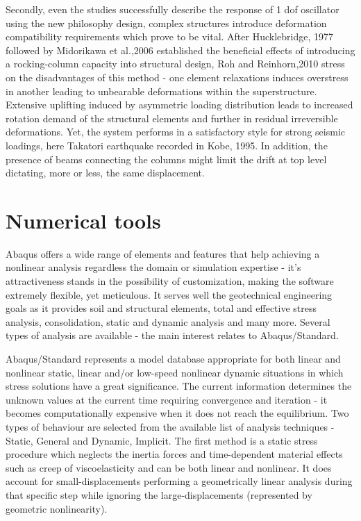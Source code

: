 \documentclass[12pt,a4paper]{report}
\begin{document}
Secondly, even the studies successfully describe the response of 1 dof oscillator using the new philosophy design, complex structures introduce deformation compatibility requirements which prove to be vital. After Hucklebridge, 1977 \cite{huckelbridge1978seismic} followed by Midorikawa et al.,2006 \cite{kanno2006new} established the beneficial effects of introducing a rocking-column capacity into structural design, Roh and Reinhorn,2010 \cite{roh2010modeling} stress on the disadvantages of this method - one element relaxations induces overstress in another leading to unbearable deformations within the superstructure. Extensive uplifting induced by asymmetric loading distribution leads to increased rotation demand of the structural elements and further in residual irreversible deformations. Yet, the system performs in a satisfactory style for strong seismic loadings, here Takatori earthquake recorded in Kobe, 1995. In addition, the presence of beams connecting the columns might limit the drift at top level dictating, more or less, the same displacement.

\section{Numerical tools}
Abaqus \cite{hibbett1998abaqus} offers a wide range of elements and features that help achieving a nonlinear analysis regardless the domain or simulation expertise - it's attractiveness stands in the possibility of customization, making the software extremely flexible, yet meticulous. It serves well the geotechnical engineering goals as it provides soil and structural elements, total and effective stress analysis, consolidation, static and dynamic analysis and many more. Several types of analysis are available - the main interest relates to Abaqus/Standard.

Abaqus/Standard represents a model database appropriate for both linear and nonlinear static, linear and/or low-speed nonlinear dynamic situations in which stress solutions have a great significance. The current information determines the unknown values at the current time requiring convergence and iteration - it becomes computationally expensive when it does not reach the equilibrium. Two types of behaviour are selected from the available list of analysis techniques - Static, General and Dynamic, Implicit. The first method is a static stress procedure which neglects the inertia forces and time-dependent material effects such as creep of viscoelasticity and can be both linear and nonlinear. It does account for small-displacements performing a geometrically linear analysis during that specific step while ignoring the large-displacements (represented by geometric nonlinearity).
\end{document}
